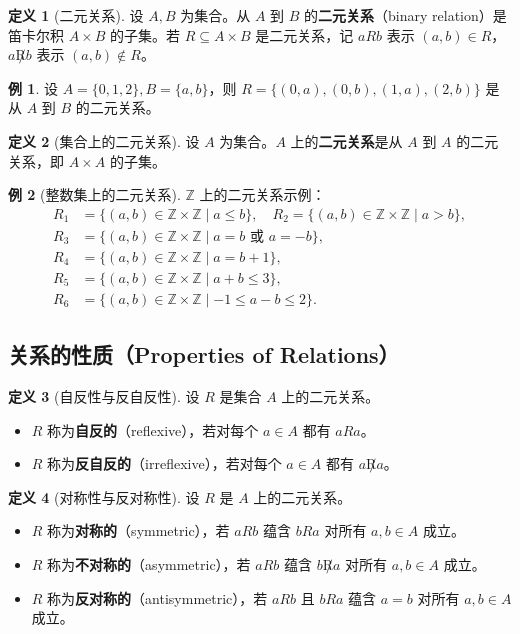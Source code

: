 \documentclass[UTF8,11pt,a4paper]{ctexbook}   %
\theoremstyle{definition}
\newtheorem{definition}{定义}[section]
\newtheorem{example}{例}[section]
\begin{document}
\begin{definition}[二元关系]
设 $A,B$ 为集合。从 $A$ 到 $B$ 的\textbf{二元关系}（binary relation）是笛卡尔积 $A \times B$ 的子集。若 $R \subseteq A \times B$ 是二元关系，记 $a R b$ 表示 $(a,b) \in R$，$a \not R b$ 表示 $(a,b) \notin R$。
\end{definition}

\begin{example}
设 $A=\{0,1,2\}, B=\{a,b\}$，则 $R=\{(0,a),(0,b),(1,a),(2,b)\}$ 是从 $A$ 到 $B$ 的二元关系。
\end{example}

\begin{definition}[集合上的二元关系]
设 $A$ 为集合。$A$ 上的\textbf{二元关系}是从 $A$ 到 $A$ 的二元关系，即 $A \times A$ 的子集。
\end{definition}

\begin{example}[整数集上的二元关系]
$\mathbb{Z}$ 上的二元关系示例：
\begin{align*}
R_1 &= \{(a,b) \in \mathbb{Z}\times\mathbb{Z} \mid a \leq b\}, \quad
R_2 = \{(a,b) \in \mathbb{Z}\times\mathbb{Z} \mid a > b\},\\
R_3 &= \{(a,b) \in \mathbb{Z}\times\mathbb{Z} \mid a = b \text{ 或 } a = -b\},\\
R_4 &= \{(a,b) \in \mathbb{Z}\times\mathbb{Z} \mid a = b+1\},\\
R_5 &= \{(a,b) \in \mathbb{Z}\times\mathbb{Z} \mid a+b \leq 3\},\\
R_6 &= \{(a,b) \in \mathbb{Z}\times\mathbb{Z} \mid -1 \leq a-b \leq 2\}.
\end{align*}
\end{example}

\subsection{关系的性质（Properties of Relations）}

\begin{definition}[自反性与反自反性]
设 $R$ 是集合 $A$ 上的二元关系。
\begin{itemize}
    \item $R$ 称为\textbf{自反的}（reflexive），若对每个 $a \in A$ 都有 $a R a$。
    \item $R$ 称为\textbf{反自反的}（irreflexive），若对每个 $a \in A$ 都有 $a \not R a$。
\end{itemize}
\end{definition}

\begin{definition}[对称性与反对称性]
设 $R$ 是 $A$ 上的二元关系。
\begin{itemize}
    \item $R$ 称为\textbf{对称的}（symmetric），若 $a R b$ 蕴含 $b R a$ 对所有 $a,b \in A$ 成立。
    \item $R$ 称为\textbf{不对称的}（asymmetric），若 $a R b$ 蕴含 $b \not R a$ 对所有 $a,b \in A$ 成立。
    \item $R$ 称为\textbf{反对称的}（antisymmetric），若 $a R b$ 且 $b R a$ 蕴含 $a=b$ 对所有 $a,b \in A$ 成立。
\end{itemize}
\end{definition}
\end{document}
